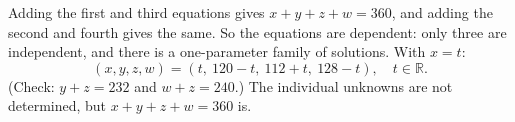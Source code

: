 Adding the first and third equations gives $x+y+z+w=360$, and adding the second and fourth gives the same. So the equations are dependent: only three are independent, and there is a one-parameter family of solutions. With $x=t$:
\[\boxed{(x,y,z,w)=(t,\ 120-t,\ 112+t,\ 128-t),\quad t\in\mathbb R.}\]
(Check: $y+z=232$ and $w+z=240$.) The individual unknowns are not determined, but $x+y+z+w=360$ is.
